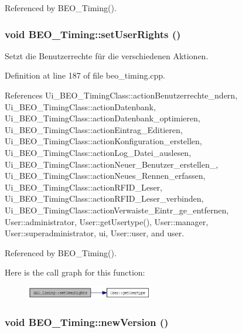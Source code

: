Referenced by BEO\_\-Timing().\hypertarget{class_b_e_o___timing_cd12cfc862cb158f92a7500f836783c7}{
\subsubsection[setUserRights]{\setlength{\rightskip}{0pt plus 5cm}void BEO\_\-Timing::setUserRights ()}}
\label{class_b_e_o___timing_cd12cfc862cb158f92a7500f836783c7}


Setzt die Benutzerrechte für die verschiedenen Aktionen. 



Definition at line 187 of file beo\_\-timing.cpp.

References Ui\_\-BEO\_\-TimingClass::actionBenutzerrechte\_\-ndern, Ui\_\-BEO\_\-TimingClass::actionDatenbank, Ui\_\-BEO\_\-TimingClass::actionDatenbank\_\-optimieren, Ui\_\-BEO\_\-TimingClass::actionEintrag\_\-Editieren, Ui\_\-BEO\_\-TimingClass::actionKonfiguration\_\-erstellen, Ui\_\-BEO\_\-TimingClass::actionLog\_\-Datei\_\-auslesen, Ui\_\-BEO\_\-TimingClass::actionNeuer\_\-Benutzer\_\-erstellen\_, Ui\_\-BEO\_\-TimingClass::actionNeues\_\-Rennen\_\-erfassen, Ui\_\-BEO\_\-TimingClass::actionRFID\_\-Leser, Ui\_\-BEO\_\-TimingClass::actionRFID\_\-Leser\_\-verbinden, Ui\_\-BEO\_\-TimingClass::actionVerwaiste\_\-Eintr\_\-ge\_\-entfernen, User::administrator, User::getUsertype(), User::manager, User::superadministrator, ui, User::user, and user.

Referenced by BEO\_\-Timing().

Here is the call graph for this function:\nopagebreak
\begin{figure}[H]
\begin{center}
\leavevmode
\includegraphics[width=157pt]{class_b_e_o___timing_cd12cfc862cb158f92a7500f836783c7_cgraph}
\end{center}
\end{figure}
\hypertarget{class_b_e_o___timing_fa8e65c455ffd3b02112fdd4e6e76878}{
\subsubsection[newVersion]{\setlength{\rightskip}{0pt plus 5cm}void BEO\_\-Timing::newVersion ()}}
\label{class_b_e_o___timing_fa8e65c455ffd3b02112fdd4e6e76878}


